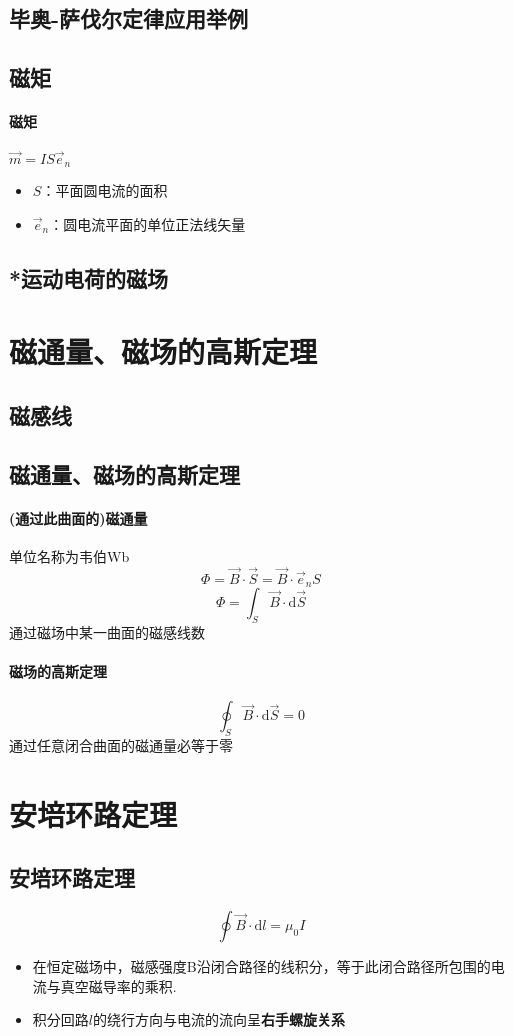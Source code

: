 \documentclass[UTF8,a4paper,12pt,scheme=chinese]{ctexbook}
\newcommand{\sll}[1]{\overrightarrow{#1}}
\newcommand{\ud}{\mathrm{d}}
\begin{document}
	\subsection{毕奥-萨伐尔定律应用举例}
	\subsection{磁矩}
	\paragraph{磁矩}$ \sll{m}=IS\sll{e}_n $
	\begin{itemize}
		\item $ S $：平面圆电流的面积
		\item $ \sll{e}_n $：圆电流平面的单位正法线矢量
	\end{itemize}
	\subsection{*运动电荷的磁场}
	\section{磁通量、磁场的高斯定理}
	\subsection{磁感线}
	\subsection{磁通量、磁场的高斯定理}
	\paragraph{(通过此曲面的)磁通量}单位名称为韦伯Wb
	$$ \varPhi=\sll{B}\cdot\sll{S}=\sll{B}\cdot\sll{e}_nS $$
	$$ \varPhi=\int_S\sll{B}\cdot\ud\sll{S} $$
	通过磁场中某一曲面的磁感线数
	\paragraph{磁场的高斯定理}
	$$ \oint_S\sll{B}\cdot\ud\sll{S}=0 $$
	通过任意闭合曲面的磁通量必等于零
	\section{安培环路定理}
	\subsection{安培环路定理}
	$$ \oint\sll{B}\cdot\ud{l}=\mu_0I $$
	\begin{itemize}
		\item 在恒定磁场中，磁感强度B沿闭合路径的线积分，等于此闭合路径所包围的电流与真空磁导率的乘积.
		\item 积分回路$ l $的绕行方向与电流的流向呈\textbf{右手螺旋关系}
	\end{itemize}
\end{document}
